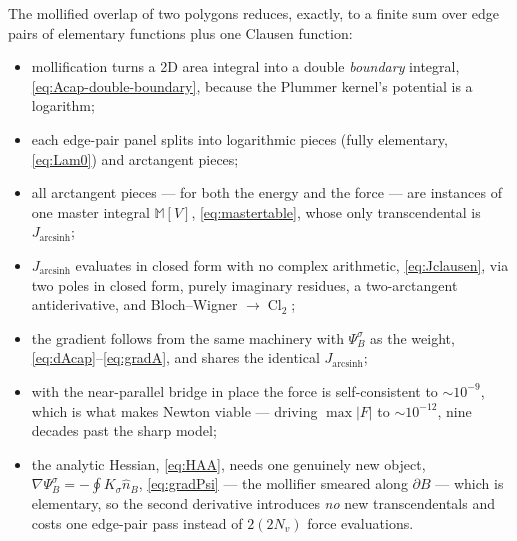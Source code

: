 \documentclass[11pt]{article}
\numberwithin{equation}{section}
\DeclareMathOperator{\arcsinh}{arcsinh}
\DeclareMathOperator{\Cl}{Cl}
\begin{document}
The mollified overlap of two polygons reduces, exactly, to a finite sum over edge pairs of elementary
functions plus one Clausen function:
\begin{itemize}
\item mollification turns a 2D area integral into a double \emph{boundary} integral,
  \eqref{eq:Acap-double-boundary}, because the Plummer kernel's potential is a logarithm;
\item each edge-pair panel splits into logarithmic pieces (fully elementary, \eqref{eq:Lam0}) and
  arctangent pieces;
\item all arctangent pieces --- for both the energy and the force --- are instances of one master
  integral $\mathbb M[V]$, \eqref{eq:mastertable}, whose only transcendental is $J_{\arcsinh}$;
\item $J_{\arcsinh}$ evaluates in closed form with no complex arithmetic, \eqref{eq:Jclausen}, via two
  poles in closed form, purely imaginary residues, a two-arctangent antiderivative, and Bloch--Wigner
  $\to\Cl_2$;
\item the gradient follows from the same machinery with $\Psi_B^\sigma$ as the weight,
  \eqref{eq:dAcap}--\eqref{eq:gradA}, and shares the identical $J_{\arcsinh}$;
\item with the near-parallel bridge in place the force is self-consistent to $\sim10^{-9}$, which is
  what makes Newton viable --- driving $\max|F|$ to $\sim10^{-12}$, nine decades past the sharp model;
\item the analytic Hessian, \eqref{eq:HAA}, needs one genuinely new object,
  $\nabla\Psi_B^\sigma=-\oint K_\sigma\hat n_B$, \eqref{eq:gradPsi} --- the mollifier smeared along
  $\partial B$ --- which is elementary, so the second derivative introduces \emph{no} new
  transcendentals and costs one edge-pair pass instead of $2(2N_v)$ force evaluations.
\end{itemize}
\end{document}
